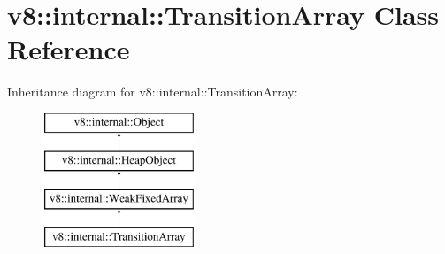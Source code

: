 \hypertarget{classv8_1_1internal_1_1TransitionArray}{}\section{v8\+:\+:internal\+:\+:Transition\+Array Class Reference}
\label{classv8_1_1internal_1_1TransitionArray}
Inheritance diagram for v8\+:\+:internal\+:\+:Transition\+Array\+:\begin{figure}[H]
\begin{center}
\leavevmode
\includegraphics[height=4.000000cm]{classv8_1_1internal_1_1TransitionArray}
\end{center}
\end{figure}
